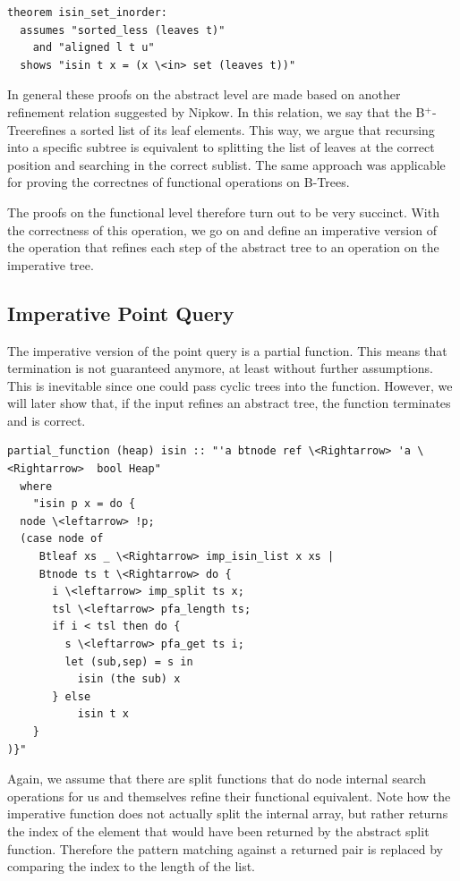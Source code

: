 \documentclass[a4paper,UKenglish,cleveref, autoref, thm-restate]{lipics-v2021}
\newcommand{\btree}{B$^+$-Tree}
\begin{document}
\begin{lstlisting}[mathescape=true, language=Isabelle,label=lst:isin-set-inorder]
theorem isin_set_inorder:
  assumes "sorted_less (leaves t)"
    and "aligned l t u"
  shows "isin t x = (x \<in> set (leaves t))"
\end{lstlisting}

In general these proofs on the abstract level are made
based on another refinement relation suggested by Nipkow. \cite{DBLP:conf/itp/Nipkow16}
In this relation, we say that the \btree refines a sorted list of its leaf elements.
This way, we argue that recursing into a specific subtree
is equivalent to splitting the list of leaves at the correct position
and searching in the correct sublist.
The same approach was applicable for proving the correctnes of functional
operations on B-Trees. \cite{DBLP:journals/afp/Mundler21}

The proofs on the functional level therefore turn out to be very succinct.
With the correctness of this operation,
we go on and define an imperative version of the operation that
refines each step of the abstract tree to an operation on the imperative tree.

\subsection{Imperative Point Query}
\label{sec:imperative_pq}

The imperative version of the point query is a partial function.
This means that termination is not guaranteed anymore,
at least without further assumptions.
This is inevitable since one could pass cyclic trees into the function.
However, we will later show that, if the input refines an abstract tree,
the function terminates and is correct.

\begin{lstlisting}[mathescape=true, language=Isabelle,label=lst:isin-imp-def]
partial_function (heap) isin :: "'a btnode ref \<Rightarrow> 'a \<Rightarrow>  bool Heap"
  where
    "isin p x = do {
  node \<leftarrow> !p;
  (case node of
     Btleaf xs _ \<Rightarrow> imp_isin_list x xs |
     Btnode ts t \<Rightarrow> do {
       i \<leftarrow> imp_split ts x;
       tsl \<leftarrow> pfa_length ts;
       if i < tsl then do {
         s \<leftarrow> pfa_get ts i;
         let (sub,sep) = s in
           isin (the sub) x
       } else
           isin t x
    }
)}"
\end{lstlisting}

Again, we assume that there are split functions that do node internal search operations for us
and themselves refine their functional equivalent.
Note how the imperative function does not actually split
the internal array, but rather returns the index of the element
that would have been returned by the abstract split function.
Therefore the pattern matching against a returned pair
is replaced by comparing the index to the length of the list.
\end{document}
